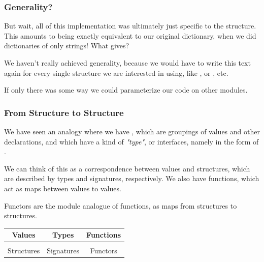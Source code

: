 \documentclass[aspectratio=169, handout]{beamer}
\begin{document}
\begin{frame}[fragile]
  \frametitle{Generality?}

  But wait, all of this implementation was ultimately just specific to the
   structure. This amounts to being exactly equivalent to our
  original dictionary, when we did dictionaries of only strings! What gives?

  \pause
  \vspace{\fill}

  We haven't really achieved generality, because we would have to write this
  text again for every single  structure we are interested in using,
  like , or , etc.

  \pause
  \vspace{\fill}

  If only there was some way we could parameterize our code on other modules.
\end{frame}


\begin{frame}[fragile]
  \frametitle{From Structure to Structure}

  We have seen an analogy where we have , which are groupings
  of values and other declarations, and which have a kind of \textit{"type"}, or
  interfaces, namely in the form of .

  \pause
  \vspace{\fill}

  We can think of this as a correspondence between values and structures, which
  are described by types and signatures, respectively. We also have functions,
  which act as maps between values to values.

  \pause
  \vspace{\fill}

  Functors are the module analogue of functions, as maps from structures to structures.

  \vspace{\fill}

  \begin{center}
    \begin{tabular}{ c|c|c }
    Values & Types & Functions \\ [0.5ex]
    \hline & \\[-1.5ex]
    Structures & Signatures & Functors
    \end{tabular}
  \end{center}
\end{frame}
\end{document}
